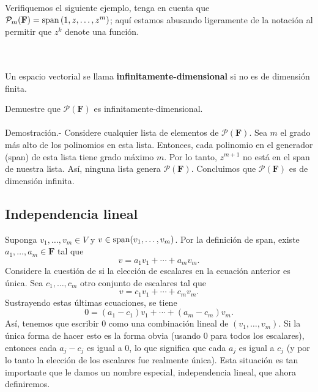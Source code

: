 Verifiquemos el siguiente ejemplo, tenga en cuenta que $\mathcal{P}_m(\textbf{F})=\mathop{\mbox{\normalfont span}}\nolimits\left(1,z,\ldots,z^m\right)$; aquí estamos abusando ligeramente de la notación al permitir que $z^k$ denote una función.

\setcounter{mydef}{14}
\begin{mydef}\,\\\\
    Un espacio vectorial se llama \textbf{infinitamente-dimensional} si no es de dimensión finita.
\end{mydef}

\begin{myejem}
    Demuestre que $\mathcal{P}(\textbf{F})$ es infinitamente-dimensional.\\\\
    Demostración.-\; Considere cualquier lista de elementos de $\mathcal{P}(\textbf{F})$. Sea $m$ el grado más alto de los polinomios en esta lista. Entonces, cada polinomio en el generador (span) de esta lista tiene grado máximo $m$. Por lo tanto, $z^{m+1}$ no está en el span de nuestra lista. Así, ninguna lista genera $\mathcal{P}(\textbf{F})$. Concluimos que $\mathcal{P}(\textbf{F})$ es de dimensión infinita.
\end{myejem}
\vspace{.5cm}

\subsection*{Independencia lineal}

Suponga $v_1,\ldots,v_m\in V$ y $v\in \mathop{\mbox{\normalfont span}}\nolimits(v_1,\ldots,v_m)$. Por la definición de span, existe $a_1,\ldots,a_m\in \textbf{F}$ tal que
$$v=a_1v_1+\cdots+a_mv_m.$$
Considere la cuestión de si la elección de escalares en la ecuación anterior es única. Sea $c_1,\ldots,c_m$ otro conjunto de escalares tal que
$$v=c_1v_1+\cdots+c_mv_m.$$
Sustrayendo estas últimas ecuaciones, se tiene
$$0=(a_1-c_1)v_1+\cdots+(a_m-c_m)v_m.$$
Así, tenemos que escribir $0$ como una combinación lineal de $(v_1,\ldots,v_m)$. Si la única forma de hacer esto es la forma obvia (usando $0$ para todos los escalares), entonces cada $a_j-c_j$ es igual a $0$, lo que significa que cada $a_j$ es igual a $c_j$ (y por lo tanto la elección de los escalares fue realmente única). Esta situación es tan importante que le damos un nombre especial, independencia lineal, que ahora definiremos.

